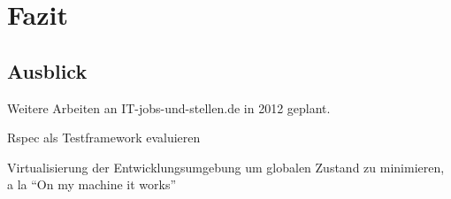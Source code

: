 \section{Fazit}

\subsection{Ausblick}
Weitere Arbeiten an IT-jobs-und-stellen.de in 2012 geplant.

Rspec als Testframework evaluieren

Virtualisierung der Entwicklungsumgebung um globalen Zustand zu minimieren, a la "`On my machine it works"'